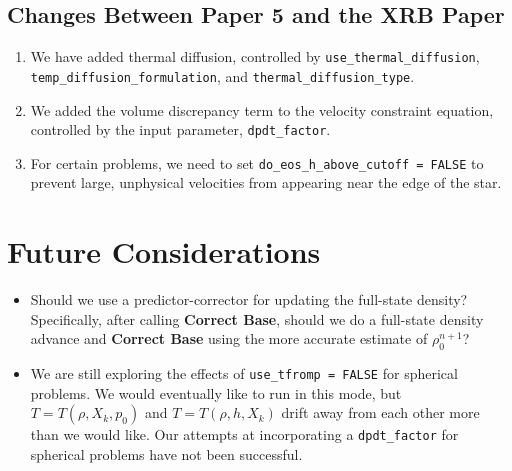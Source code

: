\subsection{Changes Between Paper 5 and the XRB Paper}
\begin{enumerate}
\item We have added thermal diffusion, controlled by {\tt use\_thermal\_diffusion},
{\tt temp\_diffusion\_formulation}, and {\tt thermal\_diffusion\_type}.
\item We added the volume discrepancy term to the velocity constraint equation,
controlled by the input parameter, {\tt dpdt\_factor}.
\item For certain problems, we need to set {\tt do\_eos\_h\_above\_cutoff = FALSE}
to prevent large, unphysical velocities from appearing near the edge of the star.
\end{enumerate}


\section{Future Considerations}

\begin{itemize}
\item Should we use a predictor-corrector for updating the full-state density?
Specifically, after calling {\bf Correct Base}, should we do a full-state density 
advance and {\bf Correct Base} using the more accurate estimate of $\rho_0^{n+1}$?
\item We are still exploring the effects of {\tt use\_tfromp = FALSE} for spherical
problems.  We would eventually like to run in this mode, but $T=T(\rho,X_k,p_0)$ 
and $T=T(\rho,h,X_k)$ drift away from each other more than we would like.  Our
attempts at incorporating a {\tt dpdt\_factor} for spherical problems have not 
been successful.
\end{itemize}

